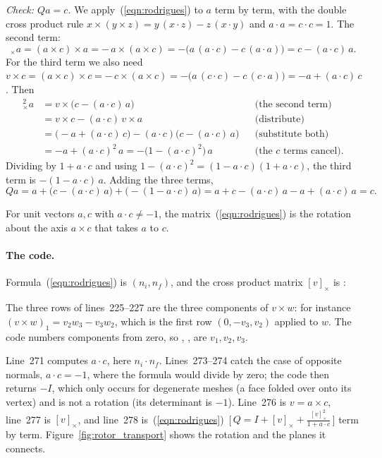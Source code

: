 \emph{Check: $Q a = c$.} We apply~(\ref{eqn:rodrigues}) to $a$ term by term, with the double cross product rule $x\times(y\times z) = y\,(x\cdot z) - z\,(x\cdot y)$ and $a\cdot a = c\cdot c = 1$. The second term:
\begin{equation*}
[v]_\times a = (a\times c)\times a = -\,a\times(a\times c) = -\big( a\,(a\cdot c) - c\,(a\cdot a) \big) = c - (a\cdot c)\, a .
\end{equation*}
For the third term we also need $v\times c = (a\times c)\times c = -\,c\times(a\times c) = -\big(a\,(c\cdot c) - c\,(c\cdot a)\big) = -a + (a\cdot c)\,c$. Then
\begin{align*}
[v]_\times^2 a &= v\times\big( c - (a\cdot c)\,a \big) && \text{(the second term)} \\
&= v\times c - (a\cdot c)\, v\times a && \text{(distribute)} \\
&= \big( -a + (a\cdot c)\,c \big) - (a\cdot c)\big( c - (a\cdot c)\,a \big) && \text{(substitute both)} \\
&= -a + (a\cdot c)^2\, a = -\big(1 - (a\cdot c)^2\big)\, a && \text{(the } c \text{ terms cancel)} .
\end{align*}
Dividing by $1 + a\cdot c$ and using $1 - (a\cdot c)^2 = (1 - a\cdot c)(1 + a\cdot c)$, the third term is $-(1 - a\cdot c)\, a$. Adding the three terms,
\begin{equation*}
Q a = a + \big( c - (a\cdot c)\,a \big) + \big( -(1 - a\cdot c)\,a \big) = a + c - (a\cdot c)\,a - a + (a\cdot c)\,a = c .
\end{equation*}
\begin{prop}
\label{prop:rodrigues}
For unit vectors $a, c$ with $a \cdot c \neq -1$, the matrix~(\ref{eqn:rodrigues}) is the rotation about the axis $a\times c$ that takes $a$ to $c$.
\end{prop}

\paragraph{The code.} Formula~(\ref{eqn:rodrigues}) is $(n_i, n_f)$, and the cross product matrix $[v]_\times$ is :

The three rows of lines~225--227 are the three components of $v \times w$: for instance $(v\times w)_1 = v_2 w_3 - v_3 w_2$, which is the first row $(0, -v_3, v_2)$ applied to $w$. The code numbers components from zero, so , ,  are $v_1, v_2, v_3$.

Line~271 computes $a\cdot c$, here $n_i\cdot n_f$. Lines~273--274 catch the case of opposite normals, $a\cdot c = -1$, where the formula would divide by zero; the code then returns $-I$, which only occurs for degenerate meshes (a face folded over onto its vertex) and is not a rotation (its determinant is $-1$). Line~276 is $v = a\times c$, line~277 is $[v]_\times$, and line~278 is~(\ref{eqn:rodrigues})~[\,$Q = I + [v]_\times + \frac{[v]_\times^2}{1 + a\cdot c}$\,] term by term. Figure~\ref{fig:rotor_transport} shows the rotation and the planes it connects.


